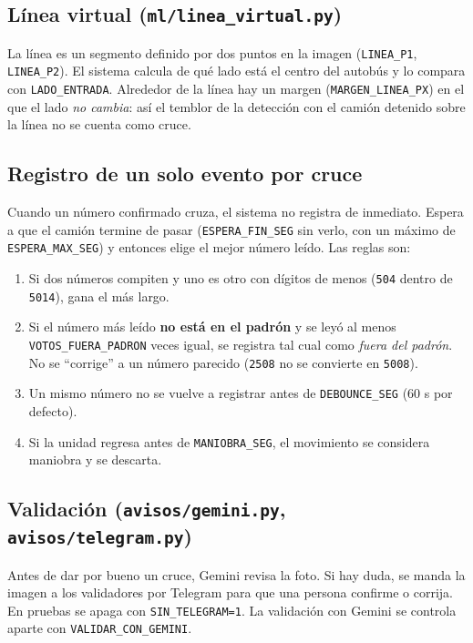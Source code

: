 \subsection{Línea virtual (\texttt{ml/linea\_virtual.py})}

La línea es un segmento definido por dos puntos en la imagen
(\texttt{LINEA\_P1}, \texttt{LINEA\_P2}). El sistema calcula de qué lado está el
centro del autobús y lo compara con \texttt{LADO\_ENTRADA}. Alrededor de la
línea hay un margen (\texttt{MARGEN\_LINEA\_PX}) en el que el lado
\emph{no cambia}: así el temblor de la detección con el camión detenido sobre la
línea no se cuenta como cruce.

\subsection{Registro de un solo evento por cruce}

Cuando un número confirmado cruza, el sistema no registra de inmediato. Espera
a que el camión termine de pasar (\texttt{ESPERA\_FIN\_SEG} sin verlo, con un
máximo de \texttt{ESPERA\_MAX\_SEG}) y entonces elige el mejor número leído.
Las reglas son:

\begin{enumerate}
  \item Si dos números compiten y uno es otro con dígitos de menos
        (\texttt{504} dentro de \texttt{5014}), gana el más largo.
  \item Si el número más leído \textbf{no está en el padrón} y se leyó al menos
        \texttt{VOTOS\_FUERA\_PADRON} veces igual, se registra tal cual como
        \emph{fuera del padrón}. No se ``corrige'' a un número parecido
        (\texttt{2508} no se convierte en \texttt{5008}).
  \item Un mismo número no se vuelve a registrar antes de
        \texttt{DEBOUNCE\_SEG} (60 s por defecto).
  \item Si la unidad regresa antes de \texttt{MANIOBRA\_SEG}, el movimiento se
        considera maniobra y se descarta.
\end{enumerate}

\subsection{Validación (\texttt{avisos/gemini.py}, \texttt{avisos/telegram.py})}

Antes de dar por bueno un cruce, Gemini revisa la foto. Si hay duda, se manda
la imagen a los validadores por Telegram para que una persona confirme o
corrija. En pruebas se apaga con \texttt{SIN\_TELEGRAM=1}. La validación con
Gemini se controla aparte con \texttt{VALIDAR\_CON\_GEMINI}.

